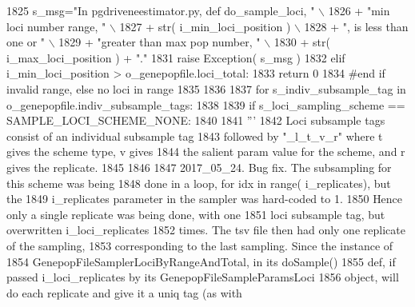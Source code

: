 \begin{DoxyCode}
1825         s\_msg=\textcolor{stringliteral}{"In pgdriveneestimator.py, def do\_sample\_loci, "} \(\backslash\)
1826                         + \textcolor{stringliteral}{"min loci number range, "} \(\backslash\)
1827                         + str( i\_min\_loci\_position ) \(\backslash\)
1828                         + \textcolor{stringliteral}{", is less than one or "} \(\backslash\)
1829                         + \textcolor{stringliteral}{"greater than max pop number, "} \(\backslash\)
1830                         + str( i\_max\_loci\_position ) + \textcolor{stringliteral}{"."} 
1831         \textcolor{keywordflow}{raise} Exception( s\_msg )
1832     \textcolor{keywordflow}{elif} i\_min\_loci\_position > o\_genepopfile.loci\_total:
1833             \textcolor{keywordflow}{return} 0
1834     \textcolor{comment}{#end if invalid range, else no loci in range}
1835 
1836 
1837     \textcolor{keywordflow}{for} s\_indiv\_subsample\_tag \textcolor{keywordflow}{in} o\_genepopfile.indiv\_subsample\_tags:
1838 
1839         \textcolor{keywordflow}{if} s\_loci\_sampling\_scheme == SAMPLE\_LOCI\_SCHEME\_NONE:
1840 
1841             \textcolor{stringliteral}{'''}
1842 \textcolor{stringliteral}{            Loci subsample tags consist of an individual subsample tag}
1843 \textcolor{stringliteral}{            followed by "\_l\_t\_v\_r" where t gives the scheme type, v gives}
1844 \textcolor{stringliteral}{            the salient param value for the scheme, and r gives the replicate.}
1845 \textcolor{stringliteral}{}
1846 \textcolor{stringliteral}{            }
1847 \textcolor{stringliteral}{            2017\_05\_24. Bug fix.  The subsampling for this scheme was being}
1848 \textcolor{stringliteral}{            done in a loop, for idx in range( i\_replicates), but the}
1849 \textcolor{stringliteral}{            i\_replicates parameter in the sampler was hard-coded to 1.}
1850 \textcolor{stringliteral}{            Hence only a single replicate was being done, with one}
1851 \textcolor{stringliteral}{            loci subsample tag, but overwritten i\_loci\_replicates}
1852 \textcolor{stringliteral}{            times.  The tsv file then had only one replicate of the sampling,}
1853 \textcolor{stringliteral}{            corresponding to the last sampling.  Since the instance of }
1854 \textcolor{stringliteral}{            GenepopFileSamplerLociByRangeAndTotal, in its doSample()}
1855 \textcolor{stringliteral}{            def, if passed i\_loci\_replicates by its GenepopFileSampleParamsLoci}
1856 \textcolor{stringliteral}{            object, will do each replicate and give it a uniq tag (as with}

\end{DoxyCode}
